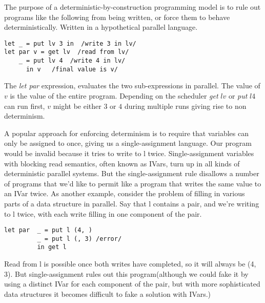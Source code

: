 \documentclass[twocolumn]{article}
\begin{document}
The purpose of a deterministic-by-construction programming model is to rule out programs like the following from being written, or force them to behave deterministically.  Written in a hypothetical parallel language. 
\begin{lstlisting}
let _ = put lv 3 in  /write 3 in lv/
let par v = get lv  /read from lv/
	_ = put lv 4  /write 4 in lv/
	  in v   /final value is v/
\end{lstlisting}
The \textit{let par} expression, evaluates the two sub-expressions in parallel. The value of $v$ is the value of the entire program. Depending on the scheduler \textit{get} $lv$ or \textit{put} $l 4$ can run first, $v$ might be either $3$ or $4$ during multiple runs giving rise to non determinism.\par
A popular approach for enforcing determinism is to require that variables can only be assigned to once, giving us a single-assignment language. Our program would be invalid because it tries to write to l twice. Single-assignment variables with blocking read semantics, often known as IVars, turn up in all kinds of deterministic parallel systems. But the single-assignment rule disallows a number of programs that we’d like to permit like a program that writes the same value to an IVar twice.
As another example, consider the problem of filling in various parts of a data structure in parallel. Say that l contains a pair, and we’re writing to l twice, with each write filling in one component of the pair. \par 
\begin{lstlisting}
let par  _ = put l (4, )
         _ = put l (, 3) /error/
         in get l
\end{lstlisting}  
Read from l is possible once both writes have completed, so it will always be (4, 3). But single-assignment rules out this program(although we could fake it by using a distinct IVar for each component of the pair, but with more sophisticated data structures it becomes difficult to fake a solution with IVars.)\par
\end{document}
